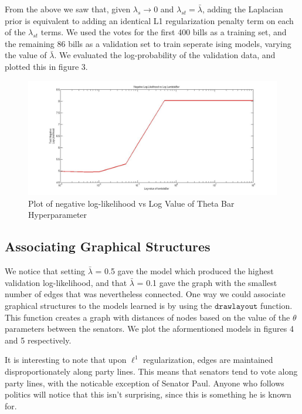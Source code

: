 \documentclass[]{article}
\begin{document}
From the above we saw that, given \(\lambda_s \rightarrow 0\) and
\(\lambda_{st} = \bar {\lambda }\), adding the Laplacian prior is
equivalent to adding an identical L1 regularization penalty term on each
of the \(\lambda_{st}\) terms. We used the votes for the first 400 bills
as a training set, and the remaining 86 bills as a validation set to
train seperate ising models, varying the value of \(\bar {\lambda }\).
We evaluated the log-probability of the validation data, and plotted
this in figure 3.

\begin{figure}
\begin{center}
\includegraphics[width=400pt]{figures/fig3.jpg}
\caption{Plot of negative log-likelihood vs Log Value of Theta Bar Hyperparameter}
\end{center}
\end{figure}

\newpage

\subsection{Associating Graphical
Structures}\label{associating-graphical-structures}

We notice that setting \(\bar{\lambda}\) = 0.5 gave the model which
produced the highest validation log-likelihood, and that
\(\bar{\lambda}\) = 0.1 gave the graph with the smallest number of edges
that was nevertheless connected. One way we could associate graphical
structures to the models learned is by using the \(\texttt{drawlayout}\)
function. This function creates a graph with distances of nodes based on
the value of the \(\theta\) parameters between the senators. We plot the
aformentioned models in figures 4 and 5 respectively.

It is interesting to note that upon \(\ell^1\) regularization, edges are
maintained disproportionately along party lines. This means that
senators tend to vote along party lines, with the noticable exception of
Senator Paul. Anyone who follows politics will notice that this isn't
surprising, since this is something he is known for.
\end{document}
